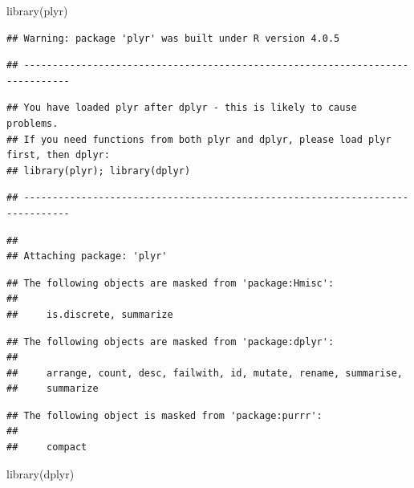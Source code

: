 \documentclass[
]{article}
\newenvironment{Shaded}{\begin{snugshade}}{\end{snugshade}}
\newcommand{\FunctionTok}[1]{\textcolor[rgb]{0.00,0.00,0.00}{#1}}
\newcommand{\NormalTok}[1]{#1}
\begin{document}
\begin{Shaded}
\begin{Highlighting}[]
\FunctionTok{library}\NormalTok{(plyr)}
\end{Highlighting}
\end{Shaded}

\begin{verbatim}
## Warning: package 'plyr' was built under R version 4.0.5
\end{verbatim}

\begin{verbatim}
## ------------------------------------------------------------------------------
\end{verbatim}

\begin{verbatim}
## You have loaded plyr after dplyr - this is likely to cause problems.
## If you need functions from both plyr and dplyr, please load plyr first, then dplyr:
## library(plyr); library(dplyr)
\end{verbatim}

\begin{verbatim}
## ------------------------------------------------------------------------------
\end{verbatim}

\begin{verbatim}
## 
## Attaching package: 'plyr'
\end{verbatim}

\begin{verbatim}
## The following objects are masked from 'package:Hmisc':
## 
##     is.discrete, summarize
\end{verbatim}

\begin{verbatim}
## The following objects are masked from 'package:dplyr':
## 
##     arrange, count, desc, failwith, id, mutate, rename, summarise,
##     summarize
\end{verbatim}

\begin{verbatim}
## The following object is masked from 'package:purrr':
## 
##     compact
\end{verbatim}

\begin{Shaded}
\begin{Highlighting}[]
\FunctionTok{library}\NormalTok{(dplyr)}
\end{Highlighting}
\end{Shaded}
\end{document}
